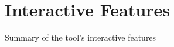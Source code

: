\section{Interactive Features}
\label{sec:interactive_features}
Summary of the tool's interactive features